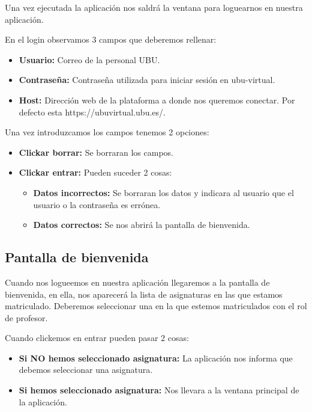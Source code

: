 Una vez ejecutada la aplicación nos saldrá la ventana para loguearnos en nuestra aplicación.


En el login observamos 3 campos que deberemos rellenar:

\begin{itemize}
	\tightlist
	\item
	\textbf{Usuario:} Correo de la personal UBU.
	\item
	\textbf{Contraseña:} Contraseña utilizada para iniciar sesión en ubu-virtual.
	\item
	\textbf{Host:} Dirección web de la plataforma a donde nos queremos conectar. Por defecto esta https://ubuvirtual.ubu.es/.
\end{itemize}

Una vez introduzcamos los campos tenemos 2 opciones:

\begin{itemize}
	\tightlist
	\item
	\textbf{Clickar borrar:} Se borraran los campos.
	\item
	\textbf{Clickar entrar:} Pueden suceder 2 cosas:
	\begin{itemize}
		\tightlist
		\item
		\textbf{Datos incorrectos:} Se borraran los datos y indicara al usuario que el usuario o la contraseña es errónea.
		\item
		\textbf{Datos correctos:} Se nos abrirá la pantalla de bienvenida.
	\end{itemize}
\end{itemize}

\subsection{Pantalla de bienvenida}


Cuando nos logueemos en nuestra aplicación llegaremos a la pantalla de bienvenida, en ella, nos aparecerá la lista de asignaturas en las que estamos matriculado. Deberemos seleccionar una en la que estemos matriculados con el rol de profesor.


Cuando clickemos en entrar pueden pasar 2 cosas:

\begin{itemize}
	\tightlist
	\item
	\textbf{Si NO hemos seleccionado asignatura:} La aplicación nos informa que debemos seleccionar una asignatura.
	\item
	\textbf{Si hemos seleccionado asignatura:} Nos llevara a la ventana principal de la aplicación.
	
\end{itemize}

